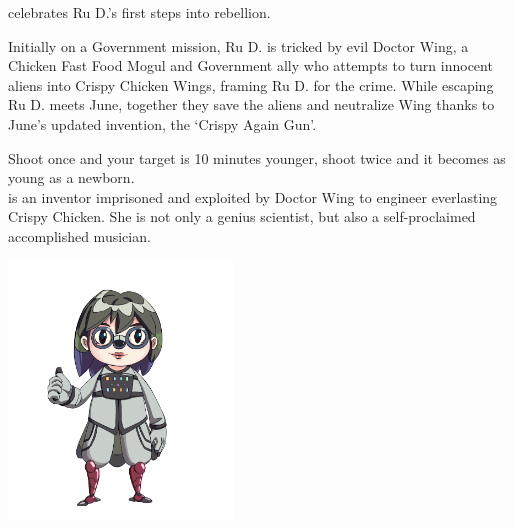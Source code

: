\clearpage 

 celebrates Ru D.'s first steps into rebellion. 

Initially on a Government mission, Ru D. is tricked by evil Doctor Wing, a Chicken Fast Food Mogul and Government ally who attempts to turn innocent aliens into Crispy Chicken Wings, framing Ru D. for the crime. While escaping Ru D. meets June, together they save the aliens and neutralize Wing thanks to June's updated invention, the `Crispy Again Gun'.

Shoot once and your target is 10 minutes younger, shoot twice and it becomes as young as a newborn.\\

 is an inventor imprisoned and exploited by Doctor Wing to engineer everlasting Crispy Chicken. She is not only a genius scientist, but also a self-proclaimed accomplished musician.

\begin{center}
\includegraphics[width=0.45\textwidth]{Assets/june}
\end{center}



\clearpage